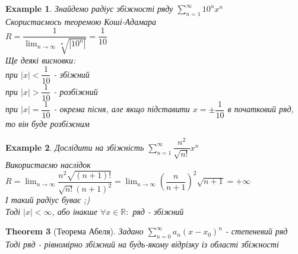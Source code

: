 \documentclass[a4paper, 14pt]{extarticle}
\def\huge{\displaystyle}
\def\bigline{\vspace{5mm}\\}
\theoremstyle{theoremdd}
\newtheorem{theorem}{Theorem}[subsection]
\theoremstyle{theoremdd}
\theoremstyle{theoremdd}
\theoremstyle{theoremdd}
\newtheorem{example}[theorem]{Example}
\theoremstyle{theoremdd}
\theoremstyle{theoremdd}
\theoremstyle{theoremdd}
\theoremstyle{theoremdd}
\begin{document}
\begin{example}
Знайдемо радіус збіжності ряду $\huge\sum_{n=1}^\infty {10}^n x^n$\\
Скористаємось теоремою Коші-Адамара\\
$R = \dfrac{1}{\huge \lim_{n \to \infty} \sqrt[n]{|{10}^n|}} = \dfrac{1}{10}$
\bigline
Ще деякі висновки: \\
при $|x| < \dfrac{1}{10}$ - збіжний\\
при $|x| > \dfrac{1}{10}$ - розбіжний\\
при $|x| = \dfrac{1}{10}$ - окрема пісня, але якщо підставити $x = \pm \dfrac{1}{10}$ в початковий ряд, то він буде розбіжним
\end{example}

\begin{example}
Дослідити на збіжність $\huge\sum_{n=1}^\infty \dfrac{n^2}{\sqrt{n!}} x^n$\\
Використаємо наслідок\\
$R = \huge\lim_{n \to \infty} \dfrac{n^2 \sqrt{(n+1)!}}{\sqrt{n!} (n+1)^2} = \lim_{n \to \infty} \left( \dfrac{n}{n+1} \right)^2 \sqrt{n+1} = +\infty$\\
І такий радіус буває ;)\\
Тоді $|x| < \infty$, або інакше $\forall x \in \mathbb{R}:$ ряд - збіжний
\end{example}

\begin{theorem}[Теорема Абеля]
Задано $\huge \sum_{n=0}^\infty a_n(x-x_0)^n$ - степеневий ряд\\
Тоді ряд - рівномірно збіжний на будь-якому відрізку із області збіжності
\end{theorem}
\end{document}
